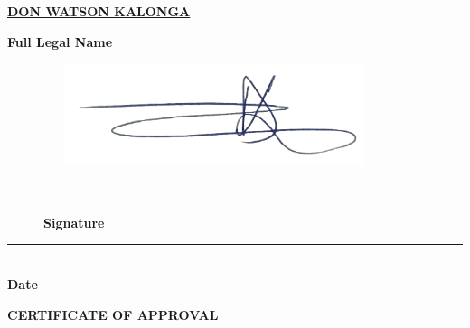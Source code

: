 \documentclass[12pt,a4paper]{report}
\begin{document}
\par \bigskip \bigskip \bigskip

\begin{large}
\begin{center}
\underline{\bf{DON WATSON KALONGA}}\\
\end{center}
\end{large}

\begin{center}
\bf{Full Legal Name}
\end{center}


\par \bigskip \bigskip \bigskip



\begin{figure}[h]
\begin{center}
\includegraphics[width = 100mm, height = 30mm]{Signature_Don Kalonga.png}
\rule{10cm}{0.2mm}\\
\bf{Signature}
\end{center}
\end{figure}



\par \bigskip \bigskip \bigskip


\begin{center}
\rule{10cm}{0.2mm}\\
\bf{Date}
\end{center}


\newpage


\thispagestyle{empty}


\begin{large}
\begin{center}
\bf{CERTIFICATE OF APPROVAL}\\
\end{center} 
\end{large}
\end{document}
